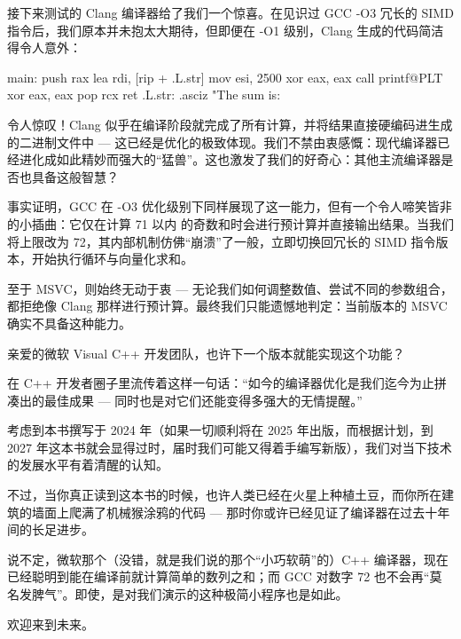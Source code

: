 接下来测试的 Clang 编译器给了我们一个惊喜。在见识过 GCC -O3 冗长的 SIMD 指令后，我们原本并未抱太大期待，但即便在 -O1 级别，Clang 生成的代码简洁得令人意外：

\begin{shell}
main:
  push rax
  lea rdi, [rip + .L.str]
  mov esi, 2500
  xor eax, eax
  call printf@PLT
  xor eax, eax
  pop rcx
  ret
.L.str:
  .asciz "The sum is: %
\end{shell}

令人惊叹！Clang 似乎在编译阶段就完成了所有计算，并将结果直接硬编码进生成的二进制文件中 --- 这已经是优化的极致体现。我们不禁由衷感慨：现代编译器已经进化成如此精妙而强大的“猛兽”。这也激发了我们的好奇心：其他主流编译器是否也具备这般智慧？

事实证明，GCC 在 -O3 优化级别下同样展现了这一能力，但有一个令人啼笑皆非的小插曲：它仅在计算 71 以内 的奇数和时会进行预计算并直接输出结果。当我们将上限改为 72，其内部机制仿佛“崩溃”了一般，立即切换回冗长的 SIMD 指令版本，开始执行循环与向量化求和。

至于 MSVC，则始终无动于衷 --- 无论我们如何调整数值、尝试不同的参数组合，都拒绝像 Clang 那样进行预计算。最终我们只能遗憾地判定：当前版本的 MSVC 确实不具备这种能力。

亲爱的微软 Visual C++ 开发团队，也许下一个版本就能实现这个功能？


在 C++ 开发者圈子里流传着这样一句话：“如今的编译器优化是我们迄今为止拼凑出的最佳成果 --- 同时也是对它们还能变得多强大的无情提醒。”

考虑到本书撰写于 2024 年（如果一切顺利将在 2025 年出版，而根据计划，到 2027 年这本书就会显得过时，届时我们可能又得着手编写新版），我们对当下技术的发展水平有着清醒的认知。

不过，当你真正读到这本书的时候，也许人类已经在火星上种植土豆，而你所在建筑的墙面上爬满了机械猴涂鸦的代码 --- 那时你或许已经见证了编译器在过去十年间的长足进步。

说不定，微软那个（没错，就是我们说的那个“小巧软萌”的）C++ 编译器，现在已经聪明到能在编译前就计算简单的数列之和；而 GCC 对数字 72 也不会再“莫名发脾气”。即使，是对我们演示的这种极简小程序也是如此。

欢迎来到未来。







